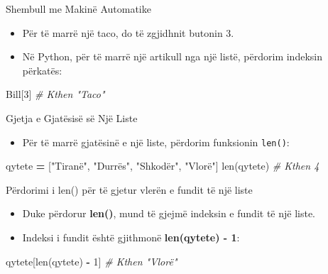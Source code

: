 \documentclass[
  ignorenonframetext,
]{beamer}
\newenvironment{Shaded}{\begin{snugshade}}{\end{snugshade}}
\newcommand{\BuiltInTok}[1]{#1}
\newcommand{\CommentTok}[1]{\textcolor[rgb]{0.56,0.35,0.01}{\textit{#1}}}
\newcommand{\DecValTok}[1]{\textcolor[rgb]{0.00,0.00,0.81}{#1}}
\newcommand{\NormalTok}[1]{#1}
\newcommand{\OperatorTok}[1]{\textcolor[rgb]{0.81,0.36,0.00}{\textbf{#1}}}
\newcommand{\StringTok}[1]{\textcolor[rgb]{0.31,0.60,0.02}{#1}}
\providecommand{\tightlist}{%
  \setlength{\itemsep}{0pt}\setlength{\parskip}{0pt}}
\begin{document}
\begin{frame}[fragile]{Shembull me Makinë Automatike}
\protect\hypertarget{shembull-me-makinuxeb-automatike}{}
\begin{itemize}
\item
  Për të marrë një taco, do të zgjidhnit butonin 3.
\item
  Në Python, për të marrë një artikull nga një listë, përdorim indeksin
  përkatës:
\end{itemize}

\begin{Shaded}
\begin{Highlighting}[]
\NormalTok{  Bill[}\DecValTok{3}\NormalTok{]  }\CommentTok{\# Kthen "Taco"}
\end{Highlighting}
\end{Shaded}
\end{frame}

\begin{frame}[fragile]{Gjetja e Gjatësisë së Një Liste}
\protect\hypertarget{gjetja-e-gjatuxebsisuxeb-suxeb-njuxeb-liste}{}
\begin{itemize}
\tightlist
\item
  Për të marrë gjatësinë e një liste, përdorim funksionin
  \texttt{len()}:
\end{itemize}

\begin{Shaded}
\begin{Highlighting}[]
\NormalTok{  qytete }\OperatorTok{=}\NormalTok{ [}\StringTok{"Tiranë"}\NormalTok{, }\StringTok{"Durrës"}\NormalTok{, }\StringTok{"Shkodër"}\NormalTok{, }\StringTok{"Vlorë"}\NormalTok{]}
  \BuiltInTok{len}\NormalTok{(qytete)  }\CommentTok{\# Kthen 4}
\end{Highlighting}
\end{Shaded}
\end{frame}

\begin{frame}[fragile]{Përdorimi i len() për të gjetur vlerën e fundit
të një liste}
\protect\hypertarget{puxebrdorimi-i-len-puxebr-tuxeb-gjetur-vleruxebn-e-fundit-tuxeb-njuxeb-liste}{}
\begin{itemize}
\item
  Duke përdorur \textbf{len()}, mund të gjejmë indeksin e fundit të një
  liste.
\item
  Indeksi i fundit është gjithmonë \textbf{len(qytete) - 1}:
\end{itemize}

\begin{Shaded}
\begin{Highlighting}[]
\NormalTok{qytete[}\BuiltInTok{len}\NormalTok{(qytete) }\OperatorTok{{-}} \DecValTok{1}\NormalTok{]  }\CommentTok{\# Kthen "Vlorë"}
\end{Highlighting}
\end{Shaded}
\end{frame}
\end{document}
